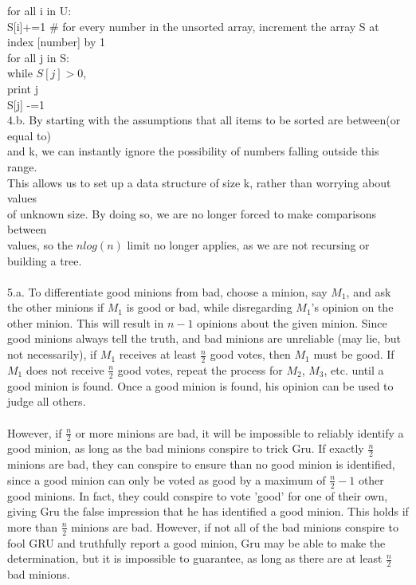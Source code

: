 \documentclass[11pt, oneside]{article}   	%
\begin{document}
\indent\indent for all i in U:\\
\indent\indent\indent S[i]+=1 \# for every number in the unsorted array, increment the array S at\\
\indent\indent\indent\indent\indent index [number] by 1\\
\indent\indent for all j in S:\\
\indent\indent\indent while $S[j] >0$,\\ 
\indent\indent\indent print j\\
\indent\indent\indent S[j] -=1\\
4.b.  By starting with the assumptions that all items to be sorted are between(or equal to)\\
 and k, we can instantly ignore the possibility of numbers falling outside this range.\\
\indent  This allows us to set up a data structure of size k, rather than worrying about values\\
\indent  of unknown size. By doing so, we are no longer forced to make comparisons between \\
\indent values, so the $nlog(n)$ limit no longer applies, as we are not recursing or building a tree.\\
\\
5.a.  To differentiate good minions from bad, choose a minion, say $M_1$, and ask the other minions if $M_1$ is good or bad, while disregarding $M_1$'s opinion on the other minion.  This will result in $n-1$ opinions about the given minion.  Since good minions always tell the truth, and bad minions are unreliable (may lie, but not necessarily), if $M_1$ receives at least $\frac{n}{2} $ good votes, then $M_1$ must be good.  If $M_1$ does not receive $\frac{n}{2}$ good votes, repeat the process for $M_2$, $M_3$, etc. until a good minion is found.  Once a good minion is found, his opinion can be used to judge all others.\\
\\
\indent However, if $\frac{n}{2}$ or more minions are bad, it will be impossible to reliably identify a good minion, as long as the bad minions conspire to trick Gru.  If exactly $\frac{n}{2}$ minions are bad, they can conspire to ensure than no good minion is identified, since a good minion can only be voted as good by a maximum of $\frac{n}{2} - 1$ other good minions.  In fact, they could conspire to vote 'good' for one of their own, giving Gru the false impression that he has identified a good minion.  This holds if more than $\frac{n}{2}$ minions are bad.  However, if not all of the bad minions conspire to fool GRU and truthfully report a good minion, Gru may be able to make the determination, but it is impossible to guarantee, as long as there are at least $\frac{n}{2}$ bad minions.\\
\end{document}
